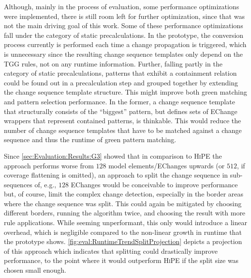 Although, mainly in the process of evaluation, some performance optimizations were implemented, there is still room left for further optimization, since that was not the main driving goal of this work.
Some of these performance optimizations fall under the category of static precalculations. In the prototype, the conversion process currently is performed each time a change propagation is triggered, which is unnecessary since the resulting change sequence templates only depend on the TGG rules, not on any runtime information.
Further, falling partly in the category of static precalculations, patterns that exhibit a containment relation could be found out in a precalculation step and grouped together by extending the change sequence template structure.
This might improve both green matching and pattern selection performance. In the former, a change sequence template that structurally consists of the \enquote{biggest} pattern, but defines sets of EChange wrappers that represent contained patterns, is thinkable. This would reduce the number of change sequence templates that have to be matched against a change sequence and thus the runtime of green pattern matching.

Since \autoref{sec:Evaluation:Results:G3} showed that in comparison to \textsc{HiPE} \cite{hipe-devops_highly_2022} the approach performs worse from $128$ model elements/EChanges upwards (or $512$, if coverage flattening is omitted), an approach to split the change sequence in sub-sequences of, e.g., $128$ EChanges would be conceivable to improve performance but, of course, limit the complex change detection, especially in the border areas where the change sequence was split. This could again be mitigated by choosing different borders, running the algorithm twice, and choosing the result with more rule applications. While seeming unperformant, this only would introduce a linear overhead, which is negligible compared to the non-linear growth in runtime that the prototype shows. \autoref{fig:eval:RuntimeTrendSplitProjection} depicts a projection of this approach which indicates that splitting could drastically improve performance, to the point where it would outperform \textsc{HiPE} if the split size was chosen small enough.


